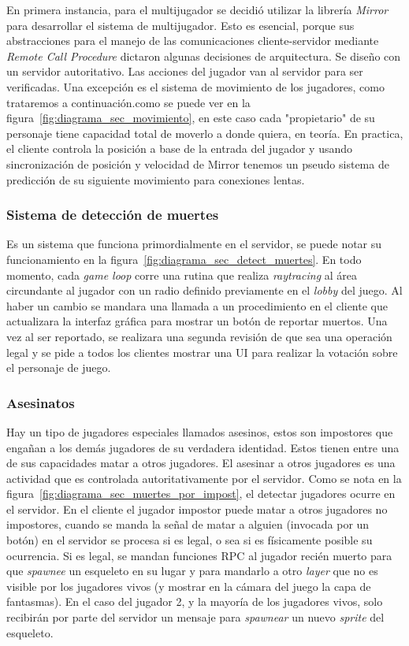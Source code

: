 En primera instancia, para el multijugador se decidió utilizar la librería \textit{Mirror} para desarrollar el sistema de multijugador. Esto es esencial, porque sus abstracciones para el manejo de las comunicaciones cliente-servidor mediante \textit{Remote Call Procedure} dictaron algunas decisiones de arquitectura.
Se diseño con un servidor autoritativo. Las acciones del jugador van al servidor para ser verificadas. Una excepción es el sistema de movimiento de los jugadores, como trataremos a continuación.como se puede ver en la figura~\ref{fig:diagrama_sec_movimiento}, en este caso cada "propietario" de su personaje tiene capacidad total de moverlo a donde quiera, en teoría. En practica, el cliente controla la posición a base de la entrada del jugador y usando sincronización de posición y velocidad de Mirror tenemos un pseudo sistema de predicción de su siguiente movimiento para conexiones lentas. 

\subsubsection{Sistema de detección de muertes}
Es un sistema que funciona primordialmente en el servidor, se puede notar su funcionamiento en la figura~\ref{fig:diagrama_sec_detect_muertes}. En todo momento, cada \textit{game loop} corre una rutina que realiza \textit{raytracing} al área circundante al jugador con un radio definido previamente en el \textit{lobby} del juego. Al haber un cambio se mandara una llamada a un procedimiento en el cliente que actualizara la interfaz gráfica para mostrar un botón de reportar muertos. Una vez al ser reportado, se realizara una segunda revisión de que sea una operación legal y se pide a todos los clientes mostrar una UI para realizar la votación sobre el personaje de juego.

\subsubsection{Asesinatos}
Hay un tipo de jugadores especiales llamados asesinos, estos son impostores que engañan a los demás jugadores de su verdadera identidad. Estos tienen entre una de sus capacidades matar a otros jugadores. El asesinar a otros jugadores es una actividad que es controlada autoritativamente por el servidor.
Como se nota en la figura~\ref{fig:diagrama_sec_muertes_por_impost}, el detectar jugadores ocurre en el servidor. En el cliente el jugador impostor puede matar a otros jugadores no impostores, cuando se manda la señal de matar a alguien (invocada por un botón) en el servidor se procesa si es legal, o sea si es físicamente posible su ocurrencia. Si es legal, se mandan funciones RPC al jugador recién muerto para que \textit{spawnee} un esqueleto en su lugar y para mandarlo a otro \textit{layer} que no es visible por los jugadores vivos (y mostrar en la cámara del juego la capa de fantasmas). En el caso del jugador 2, y la mayoría de los jugadores vivos, solo recibirán por parte del servidor un mensaje para \textit{spawnear} un nuevo \textit{sprite} del esqueleto.


